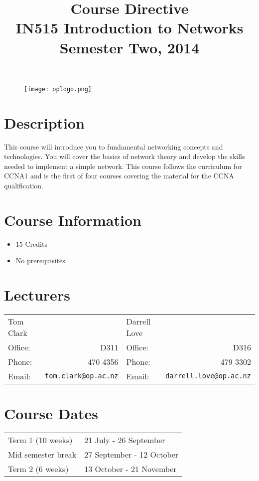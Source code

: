 \documentclass{article}
\begin{document}
\begin{figure}
\texttt{[image: oplogo.png]}
\end{figure}

\title{Course Directive\\IN515 Introduction to Networks\\Semester Two, 2014}
\date{}
\maketitle

\section*{Description}
This course will introduce you to fundamental networking concepts and technologies. You will cover the basics of network theory and develop the skills needed to implement a simple network. This course follows the curriculum for CCNA1 and is the first of four courses covering the material for the CCNA qualification.

\section*{Course Information}
\begin{itemize}
  \item 15 Credits
  \item No prerequisites
\end{itemize}

\section*{Lecturers}
\begin{tabular}{lrlr}

  Tom Clark &    & Darrell Love &  \\
     Office: & D311 & Office: & D316\\
     Phone: & 470 4356 & Phone: & 479 3302\\
     Email: & \texttt{tom.clark@op.ac.nz} & Email: & \texttt{darrell.love@op.ac.nz}\\
\end{tabular}

\section*{Course Dates}
\begin{tabular}{ll}
Term 1 (10 weeks) & 21 July - 26 September\\
Mid semester break & 27 September - 12 October\\
Term 2 (6 weeks) & 13 October - 21 November\\
\end{tabular}
\end{document}
